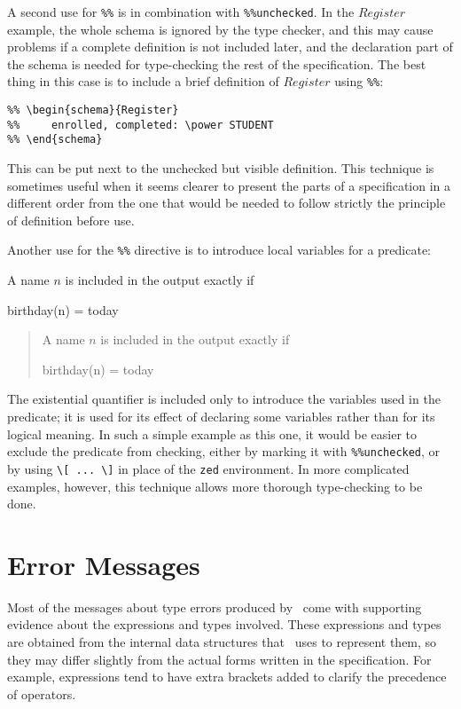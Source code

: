 {{{{{{A second use for \verb/%%/ is in combination with \verb/%%unchecked/.
In the $Register$ example, the whole schema is ignored by the
type checker, and this may cause problems if a complete definition
is not included later, and the declaration part of
the schema is needed for type-checking the rest of the specification.
The best thing in this case is to include a brief definition of
$Register$ using \verb/%%/:
\begin{verbatim}
%% \begin{schema}{Register}
%%     enrolled, completed: \power STUDENT
%% \end{schema}
\end{verbatim}
This can be put next to the unchecked but visible definition.
This technique is sometimes useful when it seems clearer to present
the parts of a specification in a different order from the one that
would be needed to follow strictly the principle of definition
before use.

Another use for the \verb/%%/ directive is to introduce local
variables for a predicate:
\begin{demo}
A name $n$ is included in the output exactly if
\begin{zed}
    birthday(n) = today
\end{zed}
\gives
\begin{quote}
A name $n$ is included in the output exactly if
\begin{zed}
    birthday(n) = today
\end{zed}
\end{quote}
\end{demo}
The existential quantifier is included only to introduce the variables
used in the predicate; it is used for its effect of declaring some
variables rather than for its logical meaning. In such a simple
example as this one, it would be easier to exclude the predicate from
checking, either by marking it with \verb/%%unchecked/, or by using 
\verb/\[ ... \]/ in place of the \verb/zed/ environment. In more
complicated examples, however, this technique allows more thorough
type-checking to be done.

\chapter{Error Messages}\label{mess}

Most of the messages about type errors produced by \fuzz\ come with
supporting evidence about the expressions and types involved.  These
expressions and types are obtained from the internal data structures
that \fuzz\ uses to represent them, so they may differ slightly from
the actual forms written in the specification.  For example,
expressions tend to have extra brackets added to clarify the
precedence of operators. 

}}}}}}
